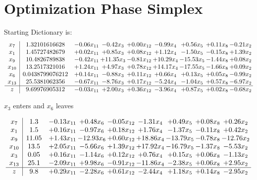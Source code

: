 \documentclass[9pt]{article}
\begin{document}
\section{Optimization Phase Simplex}
Starting Dictionary is:
\[\begin{array}{c| c c@{\hskip 2pt} c@{\hskip 2pt} c@{\hskip 2pt} c@{\hskip 2pt} c@{\hskip 2pt} c@{\hskip 2pt} c@{\hskip 2pt} }
 x_{7}   &  1.32101616628 & -0.06 x_{11} & -0.42 x_{3} & +  0.00 x_{12} & -0.99 x_{4} & +  0.56 x_{5} & +  0.11 x_{8} & -0.21 x_{2}\\
 x_{1}   &  1.45727482679 & +  0.02 x_{11} & +  0.85 x_{3} & +  0.08 x_{12} & +  1.12 x_{4} & -1.50 x_{5} & -0.15 x_{8} & +  1.39 x_{2}\\
 x_{9}   &  10.4826789838 & -0.42 x_{11} & + 11.35 x_{3} & -0.81 x_{12} & + 10.29 x_{4} & -15.53 x_{5} & -1.44 x_{8} & +  0.08 x_{2}\\
 x_{10}   &  13.2517321016 & +  1.24 x_{11} & +  4.97 x_{3} & +  0.78 x_{12} & + 14.17 x_{4} & -17.55 x_{5} & -1.66 x_{8} & +  0.09 x_{2}\\
 x_{6}   &  0.0438799076212 & +  0.14 x_{11} & -0.88 x_{3} & +  0.11 x_{12} & +  0.66 x_{4} & +  0.13 x_{5} & +  0.05 x_{8} & -0.99 x_{2}\\
 x_{13}   &  25.5381062356 & -0.67 x_{11} & -8.76 x_{3} & +  0.17 x_{12} & -5.24 x_{4} & -1.04 x_{5} & +  0.57 x_{8} & -6.97 x_{2}\\
\hline
z    &  9.69976905312 & -0.03 x_{11} & +  2.00 x_{3} & +  0.36 x_{12} & -3.96 x_{4} & +  0.87 x_{5} & +  0.02 x_{8} & -0.68 x_{2}\\
\end{array}\]


 $ x_{3} $ enters and $ x_{6} $ leaves 

 \[\begin{array}{c| c c@{\hskip 2pt} c@{\hskip 2pt} c@{\hskip 2pt} c@{\hskip 2pt} c@{\hskip 2pt} c@{\hskip 2pt} c@{\hskip 2pt} }
 x_{7}   &  1.3 & -0.13 x_{11} & +  0.48 x_{6} & -0.05 x_{12} & -1.31 x_{4} & +  0.49 x_{5} & +  0.08 x_{8} & +  0.26 x_{2}\\
 x_{1}   &  1.5 & +  0.16 x_{11} & -0.97 x_{6} & +  0.18 x_{12} & +  1.76 x_{4} & -1.37 x_{5} & -0.11 x_{8} & +  0.42 x_{2}\\
 x_{9}   &  11.05 & +  1.43 x_{11} & -12.93 x_{6} & +  0.60 x_{12} & + 18.86 x_{4} & -13.79 x_{5} & -0.78 x_{8} & -12.76 x_{2}\\
 x_{10}   &  13.5 & +  2.05 x_{11} & -5.66 x_{6} & +  1.39 x_{12} & + 17.92 x_{4} & -16.79 x_{5} & -1.37 x_{8} & -5.53 x_{2}\\
 x_{3}   &  0.05 & +  0.16 x_{11} & -1.14 x_{6} & +  0.12 x_{12} & +  0.76 x_{4} & +  0.15 x_{5} & +  0.06 x_{8} & -1.13 x_{2}\\
 x_{13}   &  25.1 & -2.09 x_{11} & +  9.98 x_{6} & -0.91 x_{12} & -11.86 x_{4} & -2.38 x_{5} & +  0.06 x_{8} & +  2.95 x_{2}\\
\hline
z    &  9.8 & +  0.29 x_{11} & -2.28 x_{6} & +  0.61 x_{12} & -2.44 x_{4} & +  1.18 x_{5} & +  0.14 x_{8} & -2.95 x_{2}\\
\end{array}\]
\end{document}
